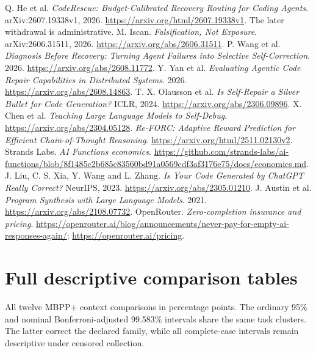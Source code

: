 \documentclass[10pt,twocolumn]{article}
\begin{document}
\newpage
\begin{thebibliography}{11}
 Q. He et al. \emph{CodeRescue: Budget-Calibrated Recovery
Routing for Coding Agents}. arXiv:2607.19338v1, 2026.
\url{https://arxiv.org/html/2607.19338v1}. The later withdrawal is administrative.
 M. Iscan. \emph{Falsification, Not Exposure}.
arXiv:2606.31511, 2026. \url{https://arxiv.org/abs/2606.31511}.
 P. Wang et al. \emph{Diagnosis Before Recovery: Turning Agent
Failures into Selective Self-Correction}. 2026.
\url{https://arxiv.org/abs/2608.11772}.
 Y. Yan et al. \emph{Evaluating Agentic Code Repair
Capabilities in Distributed Systems}. 2026.
\url{https://arxiv.org/abs/2608.14863}.
 T. X. Olausson et al. \emph{Is Self-Repair a Silver Bullet
for Code Generation?} ICLR, 2024. \url{https://arxiv.org/abs/2306.09896}.
 X. Chen et al. \emph{Teaching Large Language Models to
Self-Debug}. \url{https://arxiv.org/abs/2304.05128}.
 \emph{Re-FORC: Adaptive Reward Prediction for Efficient
Chain-of-Thought Reasoning}. \url{https://arxiv.org/html/2511.02130v2}.
 Strands Labs. \emph{AI Functions economics}.
\url{https://github.com/strands-labs/ai-functions/blob/8f1485c2b685c83560bd91a0569cdf3af3176e75/docs/economics.md}.
 J. Liu, C. S. Xia, Y. Wang and L. Zhang.
\emph{Is Your Code Generated by ChatGPT Really Correct?}
NeurIPS, 2023. \url{https://arxiv.org/abs/2305.01210}.
 J. Austin et al. \emph{Program Synthesis with Large Language
Models}. 2021. \url{https://arxiv.org/abs/2108.07732}.
 OpenRouter. \emph{Zero-completion insurance and pricing}.
\url{https://openrouter.ai/blog/announcements/never-pay-for-empty-ai-responses-again/};
\url{https://openrouter.ai/pricing}.
\end{thebibliography}

\clearpage
\onecolumn
\appendix
\section{Full descriptive comparison tables}

\begin{table}[!ht]
\centering\small
\caption{All twelve MBPP+ context comparisons in percentage points.
The ordinary 95\% and nominal Bonferroni-adjusted 99.583\% intervals share
the same task clusters. The latter correct the declared family, while all
complete-case intervals remain descriptive under censored collection.}
\label{tab:all-context-effects}

\end{table}
\end{document}
